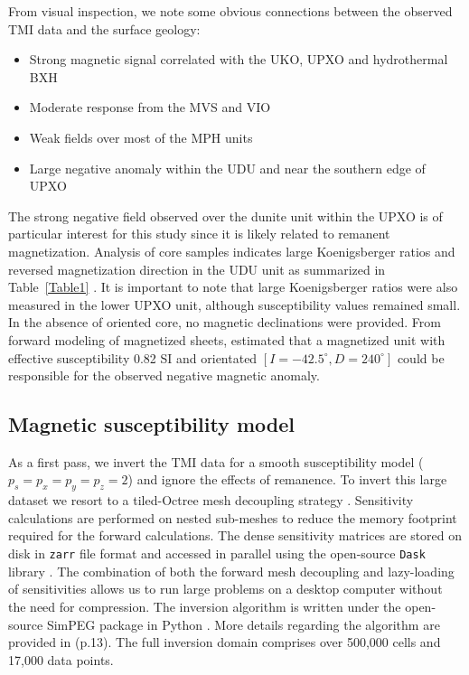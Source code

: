 \documentclass[paper]{geophysics}
\begin{document}
From visual inspection, we note some obvious connections between the observed TMI data and the surface geology:
\begin{itemize}
\item Strong magnetic signal correlated with the UKO, UPXO and hydrothermal BXH
\item Moderate response from the MVS and VIO
\item Weak fields over most of the MPH units
\item Large negative anomaly within the UDU and near the southern edge of UPXO
\end{itemize}
The strong negative field observed over the dunite unit within the UPXO is of particular interest for this study since it is likely related to remanent magnetization.
Analysis of core samples indicates large Koenigsberger ratios and reversed magnetization direction in the UDU unit as summarized in Table~\ref{Table1} \cite[~p.~47]{Montonen2012}. It is important to note that large Koenigsberger ratios were also measured in the lower UPXO unit, although susceptibility values remained small. In the absence of oriented core, no magnetic declinations were provided. From forward modeling of magnetized sheets, \cite{Montonen2012} estimated that a magnetized unit with effective susceptibility 0.82 SI and orientated $[I=-42.5^\circ, D=240^\circ]$ could be responsible for the observed negative magnetic anomaly.

\subsection{Magnetic susceptibility model}
As a first pass, we invert the TMI data for a smooth susceptibility model ($p_s=p_x=p_y=p_z=2$) and ignore the effects of remanence.
To invert this large dataset we resort to a tiled-Octree mesh decoupling strategy \cite[]{Haber2014}. Sensitivity calculations are performed on nested sub-meshes to reduce the memory footprint required for the forward calculations. The dense sensitivity matrices are stored on disk in \texttt{zarr} file format and accessed in parallel using the open-source \texttt{Dask} library \cite[]{dask2016}. The combination of both the forward mesh decoupling and lazy-loading of sensitivities allows us to run large problems on a desktop computer without the need for compression. The inversion algorithm is written under the open-source SimPEG package in Python \cite[]{Cockett2015}. More details regarding the algorithm are provided in \cite{FournierPhD2019}(p.13). The full inversion domain comprises over 500,000 cells and 17,000 data points.
\end{document}
